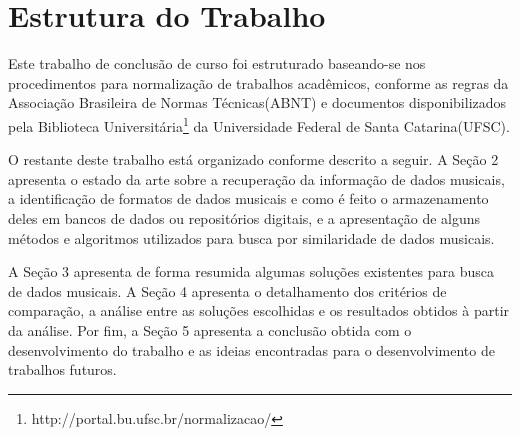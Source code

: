 \section{Estrutura do Trabalho} \label{sec:estrutura}

Este trabalho de conclusão de curso foi estruturado baseando-se nos procedimentos para normalização de trabalhos acadêmicos, conforme as regras da Associação Brasileira de Normas Técnicas(ABNT) e documentos disponibilizados pela Biblioteca Universitária\footnote{http://portal.bu.ufsc.br/normalizacao/} da Universidade Federal de Santa Catarina(UFSC).

O restante deste trabalho está organizado conforme descrito a seguir. A Seção 2 apresenta o estado da arte sobre a recuperação da informação de dados musicais, a identificação de formatos de dados musicais e como é feito o armazenamento deles em bancos de dados ou repositórios digitais, e a apresentação de alguns métodos e algoritmos utilizados para busca por similaridade de dados musicais.

A Seção 3 apresenta de forma resumida algumas soluções existentes para busca de dados musicais. A Seção 4 apresenta o detalhamento dos critérios de comparação, a análise entre as soluções escolhidas e os resultados obtidos à partir da análise. Por fim, a Seção 5 apresenta a conclusão obtida com o desenvolvimento do trabalho e as ideias encontradas para o desenvolvimento de trabalhos futuros.
